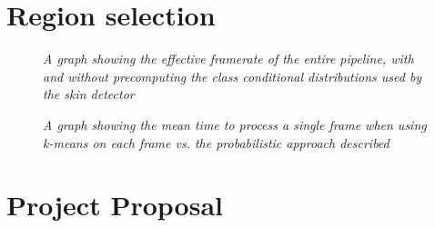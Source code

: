 \documentclass[12pt,twoside,notitlepage]{report}
\begin{document}
\begin{appendices}
\chapter{Region selection}
\begin{figure}[H]
    \centering
    
   \caption{\textit{A graph showing the effective framerate of the entire pipeline, with and without precomputing the class conditional distributions used by the skin detector}} 
\end{figure}
\begin{figure}[H]
    \centering
    
   \caption{\textit{A graph showing the mean time to process a single frame when using k-means on each frame vs. the probabilistic approach described}} 
\end{figure}


\cleardoublepage

\chapter{Project Proposal}

    
\end{appendices}
% 
\end{document}
